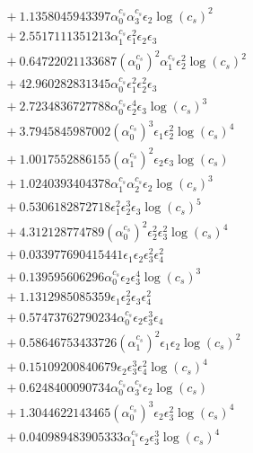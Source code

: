 \documentclass[10pt]{article}
\begin{document}
\begin{align*}
&{}  + 1.1358045943397 \alpha_{0}^{c_s} \alpha_{3}^{c_s} \epsilon_{2} \log{\left(c_{s} \right)}^{2} \\
&{}  + 2.5517111351213 \alpha_{1}^{c_s} \epsilon_{1}^{2} \epsilon_{2} \epsilon_{3} \\
&{}  + 0.64722021133687 \left(\alpha_{0}^{c_s}\right)^{2} \alpha_{1}^{c_s} \epsilon_{2}^{2} \log{\left(c_{s} \right)}^{2} \\
&{}  + 42.960282831345 \alpha_{0}^{c_s} \epsilon_{1}^{2} \epsilon_{2}^{2} \epsilon_{3} \\
&{}  + 2.7234836727788 \alpha_{0}^{c_s} \epsilon_{2}^{4} \epsilon_{3} \log{\left(c_{s} \right)}^{3} \\
&{}  + 3.7945845987002 \left(\alpha_{0}^{c_s}\right)^{3} \epsilon_{1} \epsilon_{2}^{2} \log{\left(c_{s} \right)}^{4} \\
&{}  + 1.0017552886155 \left(\alpha_{1}^{c_s}\right)^{2} \epsilon_{2} \epsilon_{3} \log{\left(c_{s} \right)} \\
&{}  + 1.0240393404378 \alpha_{1}^{c_s} \alpha_{2}^{c_s} \epsilon_{2} \log{\left(c_{s} \right)}^{3} \\
&{}  + 0.5306182872718 \epsilon_{1}^{2} \epsilon_{2}^{3} \epsilon_{3} \log{\left(c_{s} \right)}^{5} \\
&{}  + 4.312128774789 \left(\alpha_{0}^{c_s}\right)^{2} \epsilon_{2}^{2} \epsilon_{3}^{2} \log{\left(c_{s} \right)}^{4} \\
&{}  + 0.033977690415441 \epsilon_{1} \epsilon_{2} \epsilon_{3}^{2} \epsilon_{4}^{2} \\
&{}  + 0.139595606296 \alpha_{0}^{c_s} \epsilon_{2} \epsilon_{3}^{4} \log{\left(c_{s} \right)}^{3} \\
&{}  + 1.1312985085359 \epsilon_{1} \epsilon_{2}^{2} \epsilon_{3} \epsilon_{4}^{2} \\
&{}  + 0.57473762790234 \alpha_{0}^{c_s} \epsilon_{2} \epsilon_{3}^{3} \epsilon_{4} \\
&{}  + 0.58646753433726 \left(\alpha_{1}^{c_s}\right)^{2} \epsilon_{1} \epsilon_{2} \log{\left(c_{s} \right)}^{2} \\
&{}  + 0.15109200840679 \epsilon_{2} \epsilon_{3}^{3} \epsilon_{4}^{2} \log{\left(c_{s} \right)}^{4} \\
&{}  + 0.6248400090734 \alpha_{0}^{c_s} \alpha_{3}^{c_s} \epsilon_{2} \log{\left(c_{s} \right)} \\
&{}  + 1.3044622143465 \left(\alpha_{0}^{c_s}\right)^{3} \epsilon_{2} \epsilon_{3}^{2} \log{\left(c_{s} \right)}^{4} \\
&{}  + 0.040989483905333 \alpha_{1}^{c_s} \epsilon_{2} \epsilon_{3}^{3} \log{\left(c_{s} \right)}^{4} \\

\end{align*}
\end{document}
